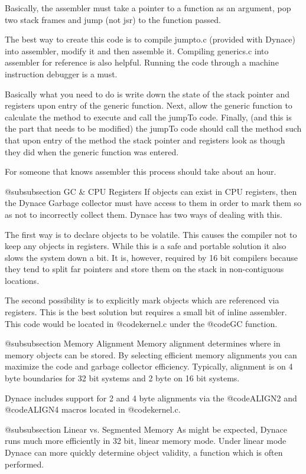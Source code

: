 Basically, the assembler must take a pointer to a function as an
argument, pop two stack frames and jump (not jsr) to the function
passed.

The best way to create this code is to compile jumpto.c (provided
with Dynace) into assembler, modify it and then assemble it.  Compiling
generics.c into assembler for reference is also helpful.  Running
the code through a machine instruction debugger is a must.

Basically what you need to do is write down the state of the stack
pointer and registers upon entry of the generic function.  Next, allow
the generic function to calculate the method to execute and call the
jumpTo code.  Finally, (and this is the part that needs to be modified)
the jumpTo code should call the method such that upon entry of the
method the stack pointer and registers look as though they did when
the generic function was entered.

For someone that knows assembler this process should take about an hour.

@subsubsection  GC & CPU Registers
If objects can exist in CPU registers, then the Dynace Garbage collector must
have access to them in order to mark them so as not to incorrectly collect
them.  Dynace has two ways of dealing with this.

The first way is to declare objects to be volatile.  This causes the
compiler not to keep any objects in registers.  While this is a safe
and portable solution it also slows the system down a bit.  It is,
however, required by 16 bit compilers because they tend to split
far pointers and store them on the stack in non-contiguous locations.

The second possibility is to explicitly mark objects which are
referenced via registers.  This is the best solution but requires
a small bit of inline assembler.  This code would be located in
@code{kernel.c} under the @code{GC} function.

@subsubsection Memory Alignment
Memory alignment determines where in memory objects can be stored.
By selecting efficient memory alignments you can maximize the code
and garbage collector efficiency.  Typically, alignment is on
4 byte boundaries for 32 bit systems and 2 byte on 16 bit systems.

Dynace includes support for 2 and 4 byte alignments via the
@code{ALIGN2} and @code{ALIGN4} macros located in @code{kernel.c}.


@subsubsection  Linear vs. Segmented Memory
As might be expected, Dynace runs much more efficiently in 32 bit,
linear memory mode.  Under linear mode Dynace can more quickly determine
object validity, a function which is often performed.


